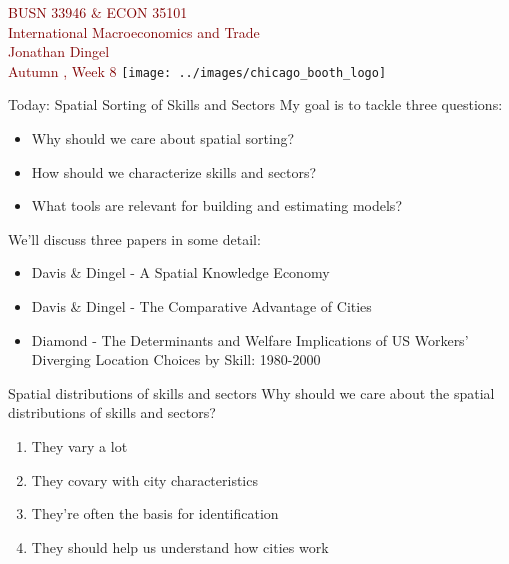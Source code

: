 \documentclass[10pt,notes=hide]{beamer}
\begin{document}
\begin{frame}[plain]
\begin{center}
\large
\textcolor{maroon}{BUSN 33946 \& ECON 35101\\
International Macroeconomics and Trade\\ 
Jonathan Dingel\\
Autumn \the\year, Week 8}
\vfill 
\texttt{[image: ../images/chicago\_booth\_logo]}
\end{center}
\end{frame}
\begin{frame}{Today: Spatial Sorting of Skills and Sectors}
My goal is to tackle three questions:
\begin{itemize}
	\item Why should we care about spatial sorting?
	\item How should we characterize skills and sectors?
	\item What tools are relevant for building and estimating models?
\end{itemize}
\vspace{5mm}
We'll discuss three papers in some detail:
\begin{itemize}
	\item Davis \& Dingel - A Spatial Knowledge Economy
	\item Davis \& Dingel - The Comparative Advantage of Cities
	\item Diamond - The Determinants and Welfare Implications of US Workers' Diverging Location Choices by Skill: 1980-2000 
\end{itemize}
\end{frame}
\begin{frame}{Spatial distributions of skills and sectors} 
Why should we care about the spatial distributions of skills and sectors?
\begin{enumerate}
	\item They vary a lot
	\item They covary with city characteristics
	\item They're often the basis for identification 
	\item They should help us understand how cities work
\end{enumerate}
\end{frame}
\end{document}

